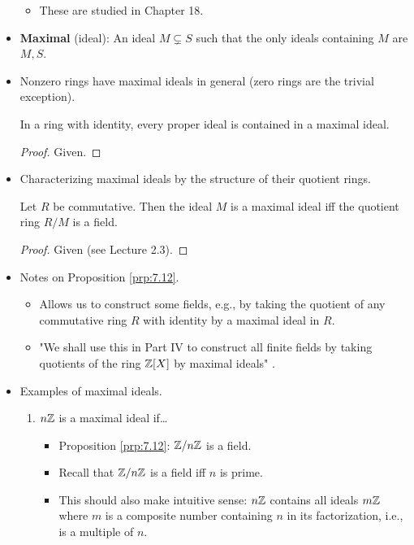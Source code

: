 \documentclass[../notes.tex]{subfiles}
\begin{document}
\begin{itemize}
\begin{itemize}
        \item These are studied in Chapter 18.
    \end{itemize}
    \item \textbf{Maximal} (ideal): An ideal $M\subsetneq S$ such that the only ideals containing $M$ are $M,S$.
    \item Nonzero rings have maximal ideals in general (zero rings are the trivial exception).
    \begin{proposition}\label{prp:7.11}
        In a ring with identity, every proper ideal is contained in a maximal ideal.
        \begin{proof}
            Given.
        \end{proof}
    \end{proposition}
    \item Characterizing maximal ideals by the structure of their quotient rings.
    \begin{proposition}\label{prp:7.12}
        Let $R$ be commutative. Then the ideal $M$ is a maximal ideal iff the quotient ring $R/M$ is a field.
        \begin{proof}
            Given (see Lecture 2.3).
        \end{proof}
    \end{proposition}
    \item Notes on Proposition \ref{prp:7.12}.
    \begin{itemize}
        \item Allows us to construct some fields, e.g., by taking the quotient of any commutative ring $R$ with identity by a maximal ideal in $R$.
        \item "We shall use this in Part IV to construct all finite fields by taking quotients of the ring $\mathbb{Z}[X]$ by maximal ideals" \parencite[254]{bib:DummitFoote}.
    \end{itemize}
    \item Examples of maximal ideals.
    \begin{enumerate}
        \item $n\mathbb{Z}$ is a maximal ideal if\dots
        \begin{itemize}
            \item Proposition \ref{prp:7.12}: $\mathbb{Z}/n\mathbb{Z}$ is a field.
            \item Recall that $\mathbb{Z}/n\mathbb{Z}$ is a field iff $n$ is prime.
            \item This should also make intuitive sense: $n\mathbb{Z}$ contains all ideals $m\mathbb{Z}$ where $m$ is a composite number containing $n$ in its factorization, i.e., is a multiple of $n$.

\end{itemize}
\end{enumerate}
\end{itemize}
\end{document}
